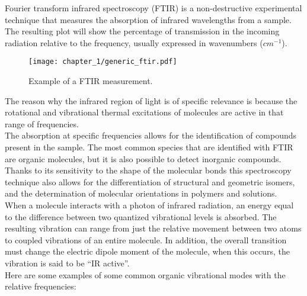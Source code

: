 Fourier transform infrared spectroscopy (FTIR) is a non-destructive experimental technique that measures the absorption of infrared wavelengths from a sample. The resulting plot will show the percentage of transmission in the incoming radiation relative to the frequency, usually expressed in wavenumbers ($cm^{-1}$). 
\begin{figure}[H]
    \centering
    \texttt{[image: chapter\_1/generic\_ftir.pdf]}
    \vspace*{-30pt}
    \caption{Example of a FTIR measurement.}
    \label{fig:generic_spectrum_ftir}
\end{figure}
The reason why the infrared region of light is of specific relevance is because the rotational and vibrational thermal excitations of molecules are active in that range of frequencies.
\\
The absorption at specific frequencies allows for the identification of compounds present in the sample. The most common species that are identified with FTIR are organic molecules, but it is also possible to detect inorganic compounds. Thanks to its sensitivity to the shape of the molecular bonds this spectroscopy technique also allows for the differentiation of structural and geometric isomers, and the determination of molecular orientations in polymers and solutions.
\\
When a molecule interacts with a photon of infrared radiation, an energy equal to the difference between two quantized vibrational levels is absorbed. The resulting vibration can range from just the relative movement between two atoms to coupled vibrations of an entire molecule. In addition, the overall transition must change the electric dipole moment of the molecule, when this occurs, the vibration is said to be “IR active”.
\\
Here are some examples of some common organic vibrational modes with the relative frequencies:

